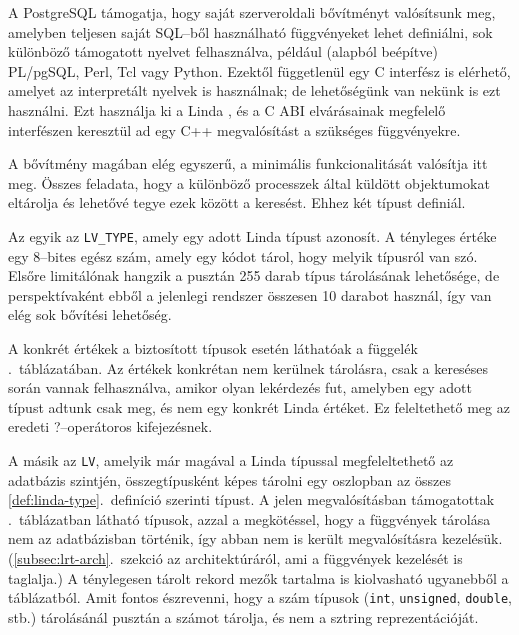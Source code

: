 A PostgreSQL támogatja, hogy saját szerveroldali bővítményt valósítsunk meg, amelyben teljesen saját SQL--ből használható függvényeket lehet definiálni, sok különböző támogatott nyelvet felhasználva, például (alapból beépítve) PL/pgSQL, Perl, Tcl vagy Python.
Ezektől függetlenül egy C interfész is elérhető, amelyet az interpretált nyelvek is használnak; de lehetőségünk van nekünk is ezt használni.
Ezt használja ki a Linda \ts{}, és a C \ac{ABI} elvárásainak megfelelő interfészen keresztül ad egy C++ megvalósítást a szükséges függvényekre.

A bővítmény magában elég egyszerű, a \ts{} minimális funkcionalitását valósítja itt meg.
Összes feladata, hogy a különböző processzek által küldött \nes{} objektumokat eltárolja és lehetővé tegye ezek között a keresést.
Ehhez két típust definiál.

Az egyik az \texttt{LV\_TYPE}, amely egy adott Linda típust azonosít.
A tényleges értéke egy 8--bites egész szám, amely egy kódot tárol, hogy melyik típusról van szó.
Elsőre limitálónak hangzik a pusztán 255 darab típus tárolásának lehetősége, de perspektívaként ebből a jelenlegi rendszer összesen 10 darabot használ, így van elég sok bővítési lehetőség.

A konkrét értékek a biztosított típusok esetén láthatóak a függelék .~táblázatában.
Az értékek konkrétan nem kerülnek tárolásra, csak a kereséses során vannak felhasználva, amikor olyan lekérdezés fut, amelyben egy adott típust adtunk csak meg, és nem egy konkrét Linda értéket.
Ez feleltethető meg az eredeti ?--operátoros kifejezésnek.

A másik az \texttt{LV}, amelyik már magával a Linda típussal megfeleltethető az adatbázis szintjén, összegtípusként képes tárolni egy oszlopban az összes \ref{def:linda-type}.~definíció szerinti típust.
A jelen megvalósításban támogatottak .~táblázatban látható típusok, azzal a megkötéssel, hogy a függvények tárolása nem az adatbázisban történik, így abban nem is került megvalósításra kezelésük.
(\ld \ref{subsec:lrt-arch}.~szekció az architektúráról, ami a függvények kezelését is taglalja.)
A ténylegesen tárolt rekord mezők tartalma is kiolvasható ugyanebből a táblázatból.
Amit fontos észrevenni, hogy a szám típusok (\texttt{int}, \texttt{unsigned}, \texttt{double}, stb.) tárolásánál pusztán a számot tárolja, és nem a sztring reprezentációját.

